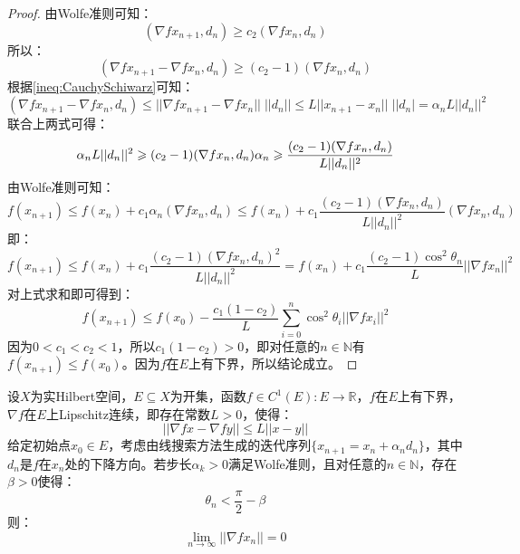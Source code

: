 \begin{proof}
	由Wolfe准则可知：
	\begin{equation*}
		(\nabla fx_{n+1},d_n)\geqslant c_2(\nabla fx_n,d_n)
	\end{equation*}
	所以：
	\begin{equation*}
		(\nabla fx_{n+1}-\nabla fx_n,d_n)\geqslant(c_2-1)(\nabla fx_n,d_n)
	\end{equation*}
	根据\cref{ineq:CauchySchiwarz}可知：
	\begin{equation*}
		(\nabla fx_{n+1}-\nabla fx_n,d_n)\leqslant||\nabla fx_{n+1}-\nabla fx_n||\;||d_n||\leqslant L||x_{n+1}-x_n||\;||d_n|=\alpha_nL||d_n||^2
	\end{equation*}
	联合上两式可得：
	\begin{equation*}
		\alpha_nL||d_n||^2\geqslant(c_2-1)(\nabla fx_n,d_n) \\
		\alpha_n\geqslant\frac{(c_2-1)(\nabla fx_n,d_n)}{L||d_n||^2}
	\end{equation*}
	由Wolfe准则可知：
	\begin{equation*}
		f(x_{n+1})\leqslant f(x_n)+c_1\alpha_n(\nabla fx_n,d_n)\leqslant f(x_n)+c_1\frac{(c_2-1)(\nabla fx_n,d_n)}{L||d_n||^2}(\nabla fx_n,d_n)
	\end{equation*}
	即：
	\begin{equation*}
		f(x_{n+1})\leqslant f(x_n)+c_1\frac{(c_2-1)(\nabla fx_n,d_n)^2}{L||d_n||^2}=f(x_n)+c_1\frac{(c_2-1)\cos^2\theta_n}{L}||\nabla fx_n||^2
	\end{equation*}
	对上式求和即可得到：
	\begin{equation*}
		f(x_{n+1})\leqslant f(x_0)-\frac{c_1(1-c_2)}{L}\sum_{i=0}^{n}\cos^2\theta_i||\nabla fx_i||^2
	\end{equation*}
	因为$0<c_1<c_2<1$，所以$c_1(1-c_2)>0$，即对任意的$n\in\mathbb{N}$有$f(x_{n+1})\leqslant f(x_0)$。因为$f$在$E$上有下界，所以结论成立。
\end{proof}
\begin{theorem}
	设$X$为实Hilbert空间，$E\subseteq X$为开集，函数$f\in C^1(E):E\to\mathbb{R}$，$f$在$E$上有下界，$\nabla f$在$E$上Lipschitz连续，即存在常数$L>0$，使得：
	\begin{equation*}
		||\nabla fx-\nabla fy||\leqslant L||x-y||
	\end{equation*}
	给定初始点$x_0\in E$，考虑由线搜索方法生成的迭代序列$\{x_{n+1}=x_n+\alpha_nd_n\}$，其中$d_n$是$f$在$x_n$处的下降方向。若步长$\alpha_k>0$满足Wolfe准则，且对任意的$n\in\mathbb{N}$，存在$\beta>0$使得：
	\begin{equation*}
		\theta_n<\frac{\pi}{2}-\beta
	\end{equation*}
	则：
	\begin{equation*}
		\lim_{n\to\infty}||\nabla fx_n||=0
	\end{equation*}
\end{theorem}
